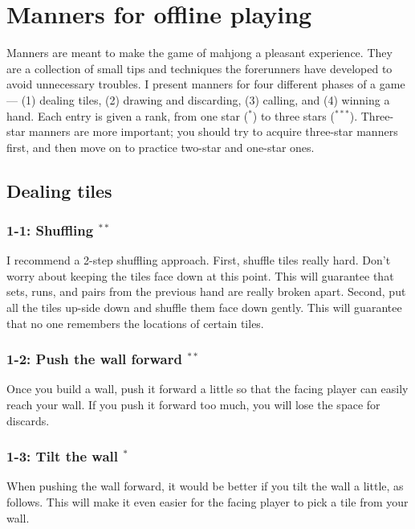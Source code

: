 
\chapter{Manners for offline playing} \label{ch:manners}
\thispagestyle{empty}

Manners are meant to make the game of mahjong a pleasant experience.
They are a collection of small tips and techniques the forerunners have developed to avoid unnecessary troubles.
I present manners for four different phases of a game --- (1) dealing tiles, (2) drawing and discarding, (3) calling, and (4) winning a hand.
Each entry is given a rank, from one star ($^*$) to three stars ($^{***}$). Three-star manners are more important; you should try to acquire three-star manners first, and then move on to practice two-star and one-star ones.

\section{Dealing tiles}

\subsection*{1-1: Shuffling $^{**}$}
I recommend a 2-step shuffling approach. First, shuffle tiles really hard. Don't worry about keeping the tiles face down at this point. This will guarantee that sets, runs, and pairs from the previous hand are really broken apart. Second, put all the tiles up-side down and shuffle them face down gently. This will guarantee that no one remembers the locations of certain tiles.

\subsection*{1-2: Push the wall forward $^{**}$}
Once you build a wall, push it forward a little so that the facing player can easily reach your wall. If you push it forward too much, you will lose the space for discards.


\subsection*{1-3: Tilt the wall $^{*}$}
When pushing the wall forward, it would be better if you tilt the wall a little, as follows. This will make it even easier for the facing player to pick a tile from your wall.
\bp
{}
\ep

